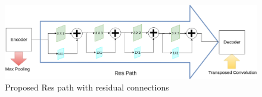 \begin{figure}
    \centerline{\includegraphics[width=1\columnwidth]{04-methodology/figures/multiresunet-respath.jpg}}
    \caption{Proposed Res path with residual connections \cite{ibtehaz2020multiresunet}}
    \label{fig:multiresunet-respath}
\end{figure}